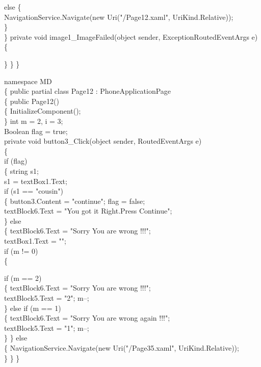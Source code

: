 {{            else
            \{\\
                NavigationService.Navigate(new Uri("/Page12.xaml", UriKind.Relative));\\
            \}\\
        \}
        private void image1_ImageFailed(object sender, ExceptionRoutedEventArgs e)\\
        \{

        \}
    \}
\}


namespace MD\\
\{
    public partial class Page12 : PhoneApplicationPage\\
    \{
        public Page12()\\
        \{
            InitializeComponent();\\
        \}
        int m = 2, i = 3;\\
        Boolean flag = true;\\
        private void button3_Click(object sender, RoutedEventArgs e)\\
        \{\\
            if (flag)\\
            \{
                string s1;\\
                s1 = textBox1.Text;\\
                if (s1 == "cousin")\\
                \{
                    button3.Content = "continue"; flag = false;\\
                    textBlock6.Text = "You got it Right.Press Continue";\\
                \}
                else\\
                \{
                    textBlock6.Text = "Sorry You are wrong !!!";\\
                    textBox1.Text = "";\\
                    if (m != 0)\\
                    \{

                        if (m == 2)\\
                        \{
                            textBlock6.Text = "Sorry You are wrong !!!";\\
                            textBlock5.Text = "2"; m--;\\
                        \}
                        else if (m == 1)\\
                        \{
                            textBlock6.Text = "Sorry You are wrong again !!!";\\
                            textBlock5.Text = "1"; m--;\\
                        \}
                    \}
                    else\\
                    \{
                        NavigationService.Navigate(new Uri("/Page35.xaml", UriKind.Relative));\\
                    \}
                \}
            \}

}}
